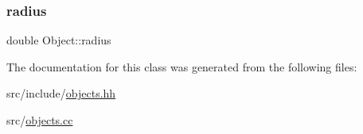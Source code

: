 \mbox{\label{class_object_aacfbf5151daad699c60efc27fb702406}} 
\subsubsection{\texorpdfstring{radius}{radius}}
{\footnotesize\ttfamily double Object\+::radius\hspace{0.3cm}{\ttfamily [protected]}}



The documentation for this class was generated from the following files\+:\begin{DoxyCompactItemize}
\item 
src/include/\mbox{\hyperlink{objects_8hh}{objects.\+hh}}\item 
src/\mbox{\hyperlink{objects_8cc}{objects.\+cc}}\end{DoxyCompactItemize}
